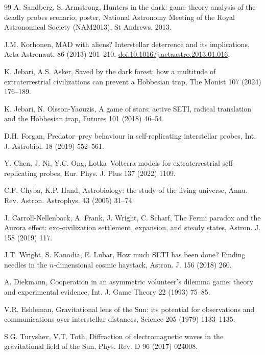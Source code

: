 \documentclass[preprint,12pt]{elsarticle}
\theoremstyle{definition}
\begin{document}
\begin{thebibliography}{99}
 A. Sandberg, S. Armstrong, Hunters in the dark: game theory analysis of the deadly probes scenario, poster, National Astronomy Meeting of the Royal Astronomical Society (NAM2013), St Andrews, 2013.

 J.M. Korhonen, MAD with aliens? Interstellar deterrence and its implications, Acta Astronaut. 86 (2013) 201--210. \href{https://doi.org/10.1016/j.actaastro.2013.01.016}{doi:10.1016/j.actaastro.2013.01.016}.

 K. Jebari, A.S. Asker, Saved by the dark forest: how a multitude of extraterrestrial civilizations can prevent a Hobbesian trap, The Monist 107 (2024) 176--189.

 K. Jebari, N. Olsson-Yaouzis, A game of stars: active SETI, radical translation and the Hobbesian trap, Futures 101 (2018) 46--54.

 D.H. Forgan, Predator--prey behaviour in self-replicating interstellar probes, Int. J. Astrobiol. 18 (2019) 552--561.

 Y. Chen, J. Ni, Y.C. Ong, Lotka--Volterra models for extraterrestrial self-replicating probes, Eur. Phys. J. Plus 137 (2022) 1109.

 C.F. Chyba, K.P. Hand, Astrobiology: the study of the living universe, Annu. Rev. Astron. Astrophys. 43 (2005) 31--74.

 J. Carroll-Nellenback, A. Frank, J. Wright, C. Scharf, The Fermi paradox and the Aurora effect: exo-civilization settlement, expansion, and steady states, Astron. J. 158 (2019) 117.

 J.T. Wright, S. Kanodia, E. Lubar, How much SETI has been done? Finding needles in the $n$-dimensional cosmic haystack, Astron. J. 156 (2018) 260.

 A. Diekmann, Cooperation in an asymmetric volunteer's dilemma game: theory and experimental evidence, Int. J. Game Theory 22 (1993) 75--85.

 V.R. Eshleman, Gravitational lens of the Sun: its potential for observations and communications over interstellar distances, Science 205 (1979) 1133--1135.

 S.G. Turyshev, V.T. Toth, Diffraction of electromagnetic waves in the gravitational field of the Sun, Phys. Rev. D 96 (2017) 024008.


\end{thebibliography}
\end{document}

